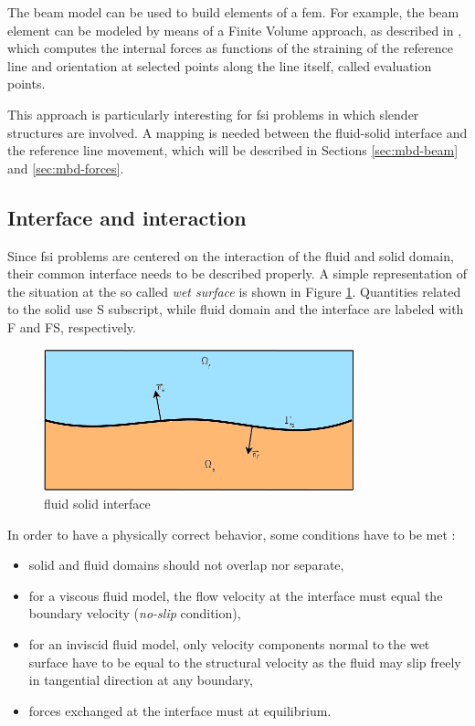 The beam model can be used to build elements of a \acrfull{fem}. For example, the beam element can be modeled by means of a Finite Volume approach, as described in \cite{ghiringhelli2000multibody}, which computes the internal forces as functions of the straining of the reference line and orientation at selected points along the line itself, called evaluation points.

This approach is particularly interesting for \acrshort{fsi} problems in which slender structures are involved. A mapping is needed between the fluid-solid interface and the reference line movement, which will be described in Sections \ref{sec:mbd-beam} and \ref{sec:mbd-forces}.


\subsection{Interface and interaction}
\label{sec:interface}

Since \acrshort{fsi} problems are centered on the interaction of the fluid and solid domain, their common interface needs to be described properly. A simple representation of the situation at the so called \textit{wet surface} is shown in Figure \ref{fig:interface}. Quantities related to the solid use S subscript, while fluid domain and the interface are labeled with F and FS, respectively. 

\begin{figure}[htbp!]
	\centering
	\includegraphics[width=0.8\textwidth]{images/interface}
	\caption{fluid solid interface}
	\label{fig:interface}
\end{figure}

In order to have a physically correct behavior, some conditions have to be met \cite{hou2012numerical}:

\begin{itemize}
	\item solid and fluid domains should not overlap nor separate,
	\item for a viscous fluid model, the flow velocity at the interface must equal the boundary velocity (\textit{no-slip} condition),
	\item for an inviscid fluid model, only velocity components normal to the wet surface have to be equal to the structural 	velocity as the fluid may slip freely in tangential direction at any boundary,
	\item forces exchanged at the interface must at equilibrium.
\end{itemize}

